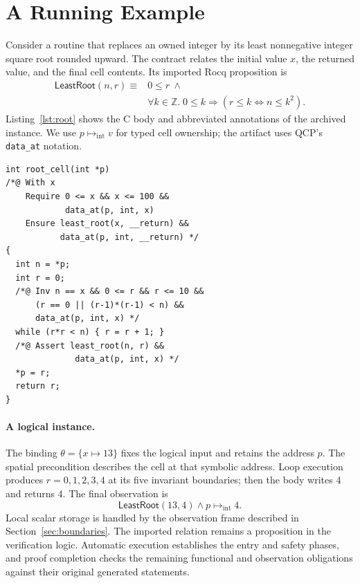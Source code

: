 \section{A Running Example}
\label{sec:example}
Consider a routine that replaces an owned integer by its least nonnegative
integer square root rounded upward. The contract relates the initial value
$x$, the returned value, and the final cell contents. Its imported Rocq
proposition is
\begin{equation}
\label{eq:least-root}
\begin{split}
\mathsf{LeastRoot}(n,r)\equiv{}&0\le r\ \land\\[-2pt]
 &\forall k\in\mathbb Z.\;0\le k\Rightarrow
       (r\le k\Leftrightarrow n\le k^2).
\end{split}
\end{equation}
Listing~\ref{lst:root} shows the C body and abbreviated annotations of the
archived instance. We use $p\mapsto_{\mathrm{int}}v$ for typed cell ownership;
the artifact uses QCP's \texttt{data\_at} notation.

\begin{lstlisting}[caption={Least-root instance with an intermediate observation. The imported relation is Equation~\eqref{eq:least-root}.},label={lst:root}]
int root_cell(int *p)
/*@ With x
    Require 0 <= x && x <= 100 &&
            data_at(p, int, x)
    Ensure least_root(x, __return) &&
           data_at(p, int, __return) */
{
  int n = *p;
  int r = 0;
  /*@ Inv n == x && 0 <= r && r <= 10 &&
      (r == 0 || (r-1)*(r-1) < n) &&
      data_at(p, int, x) */
  while (r*r < n) { r = r + 1; }
  /*@ Assert least_root(n, r) &&
              data_at(p, int, x) */
  *p = r;
  return r;
}
\end{lstlisting}

\paragraph{A logical instance.}
The binding $\theta=\{x\mapsto13\}$ fixes the logical input and retains the
address $p$. The spatial precondition describes the cell at that symbolic
address. Loop execution produces $r=0,1,2,3,4$ at its five invariant boundaries;
then the body writes 4 and returns 4. The final observation is
\[
\mathsf{LeastRoot}(13,4)\land p\mapsto_{\mathrm{int}}4.
\]
Local scalar storage is handled by the observation frame described in
Section~\ref{sec:boundaries}. The imported relation remains a proposition in
the verification logic. Automatic execution establishes the entry and safety
phases, and proof completion checks the remaining functional and observation
obligations against their original generated statements.

